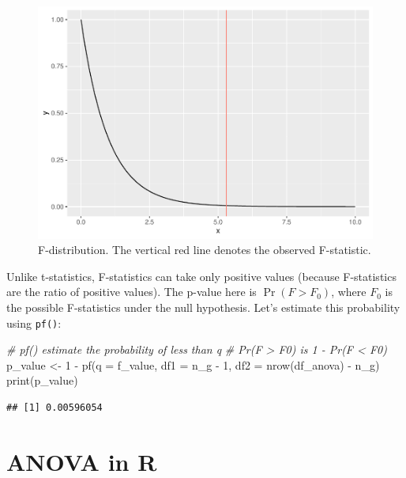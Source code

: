 \documentclass[
]{book}
\newenvironment{Shaded}{\begin{snugshade}}{\end{snugshade}}
\newcommand{\AttributeTok}[1]{\textcolor[rgb]{0.77,0.63,0.00}{#1}}
\newcommand{\CommentTok}[1]{\textcolor[rgb]{0.56,0.35,0.01}{\textit{#1}}}
\newcommand{\DecValTok}[1]{\textcolor[rgb]{0.00,0.00,0.81}{#1}}
\newcommand{\FunctionTok}[1]{\textcolor[rgb]{0.00,0.00,0.00}{#1}}
\newcommand{\NormalTok}[1]{#1}
\newcommand{\OtherTok}[1]{\textcolor[rgb]{0.56,0.35,0.01}{#1}}
\newcommand{\SpecialCharTok}[1]{\textcolor[rgb]{0.00,0.00,0.00}{#1}}
\begin{document}
\begin{figure}

{\centering \includegraphics{_main_files/figure-latex/f-dist-1} 

}

\caption{F-distribution. The vertical red line denotes the observed F-statistic.}\label{fig:f-dist}
\end{figure}

Unlike t-statistics, F-statistics can take only positive values (because F-statistics are the ratio of positive values). The p-value here is \(\Pr(F >F_0)\), where \(F_0\) is the possible F-statistics under the null hypothesis. Let's estimate this probability using \texttt{pf()}:

\begin{Shaded}
\begin{Highlighting}[]
\CommentTok{\# pf() estimate the probability of less than q}
\CommentTok{\# Pr(F \textgreater{} F0) is 1 {-} Pr(F \textless{} F0)}
\NormalTok{p\_value }\OtherTok{\textless{}{-}} \DecValTok{1} \SpecialCharTok{{-}} \FunctionTok{pf}\NormalTok{(}\AttributeTok{q =}\NormalTok{ f\_value, }\AttributeTok{df1 =}\NormalTok{ n\_g }\SpecialCharTok{{-}} \DecValTok{1}\NormalTok{, }\AttributeTok{df2 =} \FunctionTok{nrow}\NormalTok{(df\_anova) }\SpecialCharTok{{-}}\NormalTok{ n\_g)}
\FunctionTok{print}\NormalTok{(p\_value)}
\end{Highlighting}
\end{Shaded}

\begin{verbatim}
## [1] 0.00596054
\end{verbatim}

\hypertarget{anova-in-r}{%
\section{ANOVA in R}\label{anova-in-r}}
\end{document}
